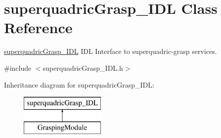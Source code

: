 \section{superquadric\+Grasp\+\_\+\+I\+DL Class Reference}
\label{classsuperquadricGrasp__IDL}


\hyperlink{classsuperquadricGrasp__IDL}{superquadric\+Grasp\+\_\+\+I\+DL} I\+DL Interface to superquadric-\/grasp services.  




{\ttfamily \#include $<$superquadric\+Grasp\+\_\+\+I\+D\+L.\+h$>$}

Inheritance diagram for superquadric\+Grasp\+\_\+\+I\+DL\+:\begin{figure}[H]
\begin{center}
\leavevmode
\includegraphics[height=2.000000cm]{classsuperquadricGrasp__IDL}
\end{center}
\end{figure}
